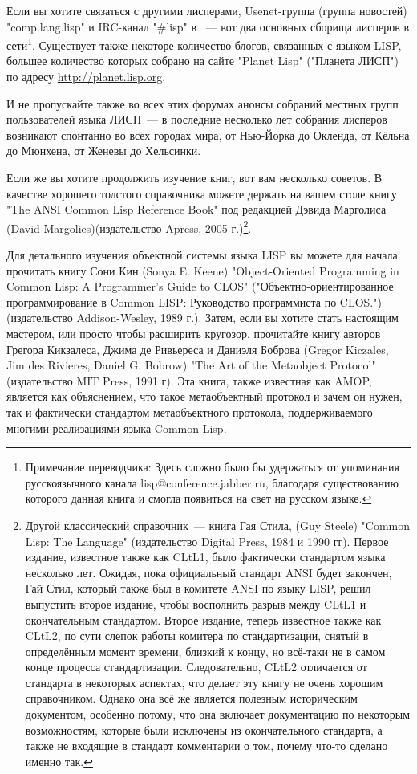 Если вы хотите связаться с другими лисперами, Usenet-группа (группа новостей)
"comp.lang.lisp" и IRC-канал "\#lisp" в ~--- вот два основных сборища лисперов в сети\footnote{Примечание переводчика:
  Здесь сложно было бы удержаться от упоминания русскоязычного канала
  lisp@conference.jabber.ru, благодаря существованию которого данная книга и смогла
  появиться на свет на русском языке.}. Существует также некоторе количество блогов,
связанных с языком LISP, большее количество которых собрано на сайте "Planet Lisp"
("Планета ЛИСП") по адресу \url{http://planet.lisp.org}.

И не пропускайте также во всех этих форумах анонсы собраний местных групп пользователей
языка ЛИСП~--- в последние несколько лет собрания лисперов возникают спонтанно во всех
городах мира, от Нью-Йорка до Окленда, от Кёльна до Мюнхена, от Женевы до Хельсинки.

Если же вы хотите продолжить изучение книг, вот вам несколько советов. В качестве хорошего
толстого справочника можете держать на вашем столе книгу "The ANSI Common Lisp Reference
Book" под редакцией Дэвида Марголиса (David Margolies)(издательство Apress, 2005
г.)\footnote{Другой классический справочник~--- книга Гая Стила, (Guy Steele) "Common Lisp:
  The Language" (издательство Digital Press, 1984 и 1990 гг). Первое издание, известное
  также как CLtL1, было фактически стандартом языка несколько лет. Ожидая, пока
  официальный стандарт ANSI будет закончен, Гай Стил, который также был в комитете ANSI по
  языку LISP, решил выпустить второе издание, чтобы восполнить разрыв между CLtL1 и
  окончательным стандартом. Второе издание, теперь известное также как CLtL2, по сути
  слепок работы комитера по стандартизации, снятый в определённым момент времени, близкий
  к концу, но всё-таки не в самом конце процесса стандартизации. Следовательно, CLtL2
  отличается от стандарта в некоторых аспектах, что делает эту книгу не очень хорошим
  справочником. Однако она всё же является полезным историческим документом, особенно
  потому, что она включает документацию по некоторым возможностям, которые были исключены
  из окончательного стандарта, а также не входящие в стандарт комментарии о том, почему
  что-то сделано именно так.}.

Для детального изучения объектной системы языка LISP вы можете для начала прочитать книгу
Сони Кин (Sonya E. Keene) "Object-Oriented Programming in Common Lisp: A Programmer's
Guide to CLOS" ("Объектно-ориентированное программирование в Common LISP: Руководство
программиста по CLOS.") (издательство Addison-Wesley, 1989 г.). Затем, если вы хотите
стать настоящим мастером, или просто чтобы расширить кругозор, прочитайте книгу авторов
Грегора Кикзалеса, Джима де Ривьереса и Даниэля Боброва (Gregor Kiczales, Jim des
Rivieres, Daniel G. Bobrow) "The Art of the Metaobject Protocol" (издательство MIT Press,
1991 г). Эта книга, также известная как AMOP, является как объяснением, что такое
метаобъектный протокол и зачем он нужен, так и фактически стандартом метаобъектного
протокола, поддерживаемого многими реализациями языка Common Lisp.

